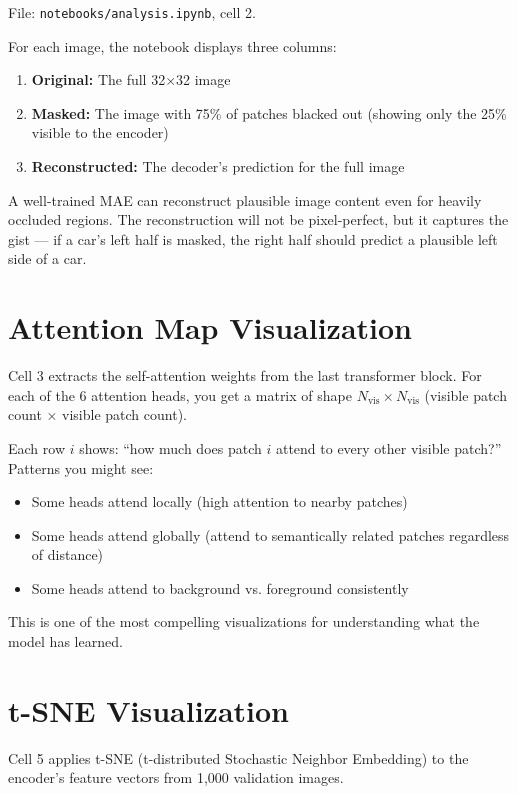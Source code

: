 \documentclass[12pt, a4paper]{report}
\begin{document}
File: \texttt{notebooks/analysis.ipynb}, cell 2.

For each image, the notebook displays three columns:
\begin{enumerate}
    \item \textbf{Original:} The full 32×32 image
    \item \textbf{Masked:} The image with 75\% of patches blacked out (showing only the 25\% visible to the encoder)
    \item \textbf{Reconstructed:} The decoder's prediction for the full image
\end{enumerate}

A well-trained MAE can reconstruct plausible image content even for heavily occluded regions. The reconstruction will not be pixel-perfect, but it captures the gist — if a car's left half is masked, the right half should predict a plausible left side of a car.

\section{Attention Map Visualization}

Cell 3 extracts the self-attention weights from the last transformer block. For each of the 6 attention heads, you get a matrix of shape $N_{\text{vis}} \times N_{\text{vis}}$ (visible patch count × visible patch count).

Each row $i$ shows: ``how much does patch $i$ attend to every other visible patch?'' Patterns you might see:
\begin{itemize}
    \item Some heads attend locally (high attention to nearby patches)
    \item Some heads attend globally (attend to semantically related patches regardless of distance)
    \item Some heads attend to background vs. foreground consistently
\end{itemize}

This is one of the most compelling visualizations for understanding what the model has learned.

\section{t-SNE Visualization}

Cell 5 applies t-SNE (t-distributed Stochastic Neighbor Embedding) to the encoder's feature vectors from 1,000 validation images.
\end{document}
